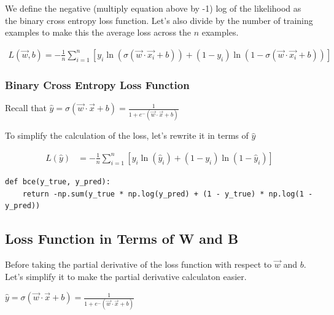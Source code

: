 \documentclass[openany]{book}
\begin{document}
We define the negative (multiply equation above by -1) log of the
likelihood as the binary cross entropy loss function. Let's also divide
by the number of training examples to make this the average loss across
the \(n\) examples.

\begin{align*}
L(\vec{w}, b) = -\frac{1}{n}  \sum_{i=1}^{n}[ y_i \ln(\sigma{(\vec{w} \cdot \vec{x_i} + b)}) + (1-y_i) \ln(1 - \sigma{(\vec{w} \cdot \vec{x_i} + b)})] 
\end{align*}

    \subsubsection{Binary Cross Entropy Loss
Function}\label{binary-cross-entropy-loss-function}

Recall that
\(\hat y = \sigma{(\vec{w} \cdot \vec{x} + b)} = \frac{1}{1+e^-(\vec{w} \cdot \vec{x} + b)}\)

To simplify the calculation of the loss, let's rewrite it in terms of
\(\hat y\)

\begin{align*}
L(\hat y) &= -\frac{1}{n} \sum_{i=1}^{n} [y_i \ln(\hat y_i) + (1-y_i) \ln(1 - \hat y_i)]
\end{align*}

\begin{tcolorbox}
\tiny
\begin{verbatim}
def bce(y_true, y_pred):
    return -np.sum(y_true * np.log(y_pred) + (1 - y_true) * np.log(1 - y_pred))
\end{verbatim}
\end{tcolorbox}

    \subsection{Loss Function in Terms of W and
B}\label{loss-function-in-terms-of-w-and-b}

Before taking the partial derivative of the loss function with respect
to \(\vec{w}\) and \(b\). Let's simplify it to make the partial
derivative calculaton easier.

\(\hat y = \sigma{(\vec{w} \cdot \vec{x} + b)} = \frac{1}{1+e^-(\vec{w} \cdot \vec{x} + b)}\)
\end{document}
